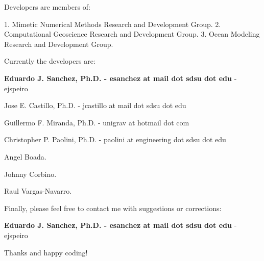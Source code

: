 \begin{DoxyPre}Developers are members of:\end{DoxyPre}



\begin{DoxyPre}1. Mimetic Numerical Methods Research and Development Group.
2. Computational Geoscience Research and Development Group.
3. Ocean Modeling Research and Development Group.\end{DoxyPre}



\begin{DoxyPre}Currently the developers are:\end{DoxyPre}



\begin{DoxyPre}
\begin{DoxyEnumerate}
\item {\bfseries Eduardo J. Sanchez, Ph.D. - esanchez at mail dot sdsu dot edu} - ejspeiro
\item Jose E. Castillo, Ph.D. - jcastillo at mail dot sdsu dot edu
\item Guillermo F. Miranda, Ph.D. - unigrav at hotmail dot com
\item Christopher P. Paolini, Ph.D. - paolini at engineering dot sdsu dot edu
\item Angel Boada.
\item Johnny Corbino.
\item Raul Vargas-Navarro.
\end{DoxyEnumerate}\end{DoxyPre}



\begin{DoxyPre}Finally, please feel free to contact me with suggestions or corrections:\end{DoxyPre}



\begin{DoxyPre}{\bfseries Eduardo J. Sanchez, Ph.D. - esanchez at mail dot sdsu dot edu} - ejspeiro\end{DoxyPre}



\begin{DoxyPre}Thanks and happy coding!
\end{DoxyPre}
 
